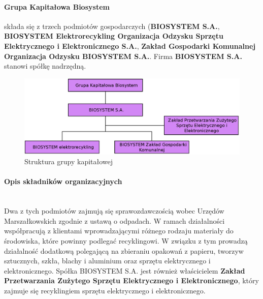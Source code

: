 

\paragraph{Grupa Kapitałowa Biosystem} składa się z trzech podmiotów gospodarczych (\textbf{BIOSYSTEM S.A.}, \textbf{BIOSYSTEM Elektrorecykling Organizacja Odzysku Sprzętu Elektrycznego i Elektronicznego S.A.}, \textbf{Zakład Gospodarki Komunalnej Organizacja Odzysku BIOSYSTEM S.A.}. Firma \textbf{BIOSYSTEM S.A.} stanowi spółkę nadrzędną.

\begin{figure}[H]
	\centering
	\includegraphics[width=\textwidth]{img/group_chart.eps}
	\caption{Struktura grupy kapitałowej}
\end{figure}

\paragraph{Opis składników organizacyjnych} \ \\
Dwa z tych podmiotów zajmują się sprawozdawczością wobec Urzędów Marszałkowskich zgodnie z ustawą o odpadach.
W ramach działalności współpracują z klientami wprowadzającymi różnego rodzaju materiały do środowiska, które powinny podlegać recyklingowi.
W związku z tym prowadzą działalność dodatkową polegającą na zbieraniu opakowań z papieru, tworzyw sztucznych, szkła, blachy i aluminium oraz sprzętu elektrycznego i elektronicznego.
Spółka BIOSYSTEM S.A. jest również właścicielem \textbf{Zakład Przetwarzania Zużytego Sprzętu Elektrycznego i Elektronicznego}, który zajmuje się recyklingiem sprzętu elektrycznego i elektronicznego. 

